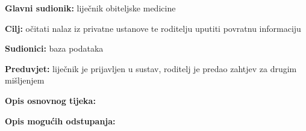                     \noindent {}
					\begin{packed_item}
	
						\item \textbf{Glavni sudionik: }liječnik obiteljske medicine
						\item  \textbf{Cilj:} očitati nalaz iz privatne ustanove te roditelju uputiti povratnu informaciju 
						\item  \textbf{Sudionici:} baza podataka
						\item  \textbf{Preduvjet:} liječnik je prijavljen u sustav, roditelj je predao zahtjev za drugim mišljenjem
						\item  \textbf{Opis osnovnog tijeka:}
						
						\item[] \begin{packed_enum}
	
							\item 
							\item 
							\item 

						\end{packed_enum}
						
						\item  \textbf{Opis mogućih odstupanja:}
						
						\item[] \begin{packed_item}
	
							\item[2.a] 
							\item[] \begin{packed_enum}
								
								\item 
								\item 
							\end{packed_enum}
							
						\end{packed_item}
					\end{packed_item}
                    
